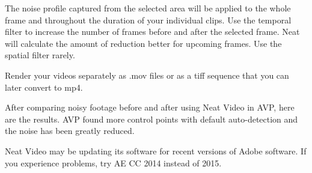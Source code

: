 \begin{fullwidth}
The noise profile captured from the selected area will be applied to the whole frame and throughout the duration of your individual clips. Use the temporal filter to increase the number of frames before and after the selected frame. Neat will calculate the amount of reduction better for upcoming frames. Use the spatial filter rarely.


Render your videos separately as .mov files or as a tiff sequence that you can later convert to mp4. 

After comparing noisy footage before and after using Neat Video in AVP, here are the results. AVP found more control points with default auto-detection and the noise has been greatly reduced.



\tip Neat Video may be updating its software for recent versions of Adobe software. If you experience problems, try AE CC 2014 instead of 2015.

\clearpage
\end{fullwidth}